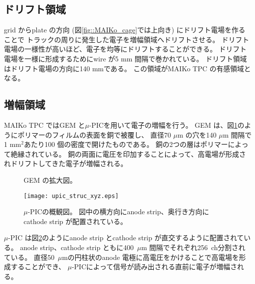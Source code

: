 \documentclass[../master]{subfiles}
\begin{document}

\subsection{ドリフト領域}
grid からplate の方向 (図\ref{fig::MAIKo_cage}では上向き) にドリフト電場を作ることで
トラックの周りに発生した電子を増幅領域へドリフトさせる。
ドリフト電場の一様性が高いほど、電子を均等にドリフトすることができる。
ドリフト電場を一様に形成するためにwire が5 mm 間隔で巻かれている。
ドリフト領域はドリフト電場の方向に140 mmである。
この領域がMAIKo TPC の有感領域となる。

\subsection{増幅領域}
MAIKo TPC ではGEM と$\mu$-PICを用いて電子の増幅を行う。
GEM は、図\ref{pic::GEM}のようにポリマーのフィルムの表面を銅で被覆し、
直径70 $\mu$m の穴を140 $\mu$m 間隔で1 mm$^2$あたり100 個の密度で開けたものである。
銅の2つの層はポリマーによって絶縁されている。
銅の両面に電圧を印加することによって、高電場が形成されドリフトしてきた電子が増幅される。
\begin{figure}
  \centering
  \caption{GEM の拡大図。}
  \label{pic::GEM}  
\end{figure}
\begin{figure}
  \centering
  \texttt{[image: upic\_struc\_xyz.eps]}
  \caption[$\mu$-PICの概観図。]{$\mu$-PICの概観図。
    図中の横方向にanode strip、奥行き方向にcathode strip が配置されている。
  }
  \label{fig::mupic}
\end{figure}
$\mu$-PIC は図\ref{fig::mupic}のようにanode strip とcathode strip が直交するように配置されている。
anode strip、cathode strip ともに400~$\mu$m 間隔でそれぞれ256~ch分割されている。
直径50~$\mu$mの円柱状のanode 電極に高電圧をかけることで高電場を形成することができ、
$\mu$-PICによって信号が読み出される直前に電子が増幅される。
\end{document}
